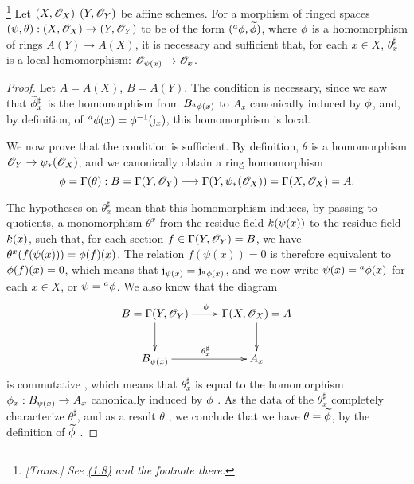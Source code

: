 \begin{theorem}[1.7.3]
\label{1.1.7.3}
\footnote{\emph{[Trans.] See \hyperref[subsection:1.1.8]{(1.8)} and the footnote there.}}
Let $(X,\mathscr{O}_X)$  $(Y,\mathscr{O}_Y)$ be affine schemes.
For a morphism of ringed spaces $(\psi,\theta):(X,\sh{O}_X)\to(Y,\sh{O}_Y)$ to be of the form $({}^a\phi,\widetilde{\phi})$, where $\phi$ is a homomorphism of rings $A(Y)\to A(X)$, it is necessary and sufficient that, for each $x\in X$, $\theta_x^\sharp$ is a local homomorphism: $\sh{O}_{\psi(x)}\to\sh{O}_x$.
\end{theorem}

\begin{proof}
\label{proof-1.1.7.3}
Let $A=A(X)$, $B=A(Y)$.
The condition is necessary, since we saw  that $\widetilde{\phi}_x^\sharp$ is the homomorphism from $B_{{}^a\phi(x)}$ to $A_x$ canonically induced by $\phi$, and, by definition, of ${}^a\phi(x)=\phi^{-1}(\mathfrak{j}_x)$, this homomorphism is local.

We now prove that the condition is sufficient.
By definition, $\theta$ is a homomorphism $\sh{O}_Y\to\psi_*(\sh{O}_X)$, and we canonically obtain a ring homomorphism
\[
  \vphi=\Gamma(\theta):B=\Gamma(Y,\sh{O}_Y)
  \to\Gamma(Y,\psi_*(\sh{O}_X))=\Gamma(X,\sh{O}_X)=A.
\]

The hypotheses on $\theta_x^\sharp$ mean that this homomorphism induces, by passing to quotients, a monomorphism $\theta^x$ from the residue field $k(\psi(x))$ to the residue field $k(x)$, such that, for each section $f\in\Gamma(Y,\mathscr{O}_Y)=B$, we have $\theta^x(f(\psi(x)))=\phi(f)(x)$.
The relation $f(\psi(x))=0$ is therefore equivalent to $\phi(f)(x)=0$, which means that $\mathfrak{j}_{\psi(x)}=\mathfrak{j}_{{}^a\phi(x)}$, and we now write $\psi(x)={}^a\phi(x)$ for each $x\in X$, or $\psi={}^a\phi$.
We also know that the diagram
\[
  \xymatrix{
    B=\Gamma(Y,\sh{O}_Y)\ar[r]^\vphi\ar[d] &
    \Gamma(X,\sh{O}_X)=A\ar[d]\\
    B_{\psi(x)}\ar[r]^{\theta_x^\sharp} &
    A_x
  }
\]
is commutative , which means that $\theta_x^\sharp$ is equal to the homomorphism $\vphi_x:B_{\psi(x)}\to A_x$ canonically induced by $\phi$ .
As the data of the $\theta_x^\sharp$ completely characterize $\theta^\sharp$, and as a result $\theta$ , we conclude that we have $\theta=\widetilde{\phi}$, by the definition of $\widetilde{\phi}$ .
\end{proof}

